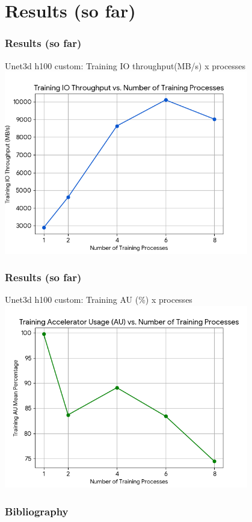 \documentclass[brazil, bsc, 10pt]{beamer}
\begin{document}
\section{Results (so far)}

\begin{frame}
	\frametitle{Results (so far)}
    \begin{block}{Unet3d h100 custom: Training IO throughput(MB/s) x processes}
		\includegraphics[width=0.8\textwidth]{./images/training_io.png}
	\end{block}
\end{frame}

\begin{frame}
	\frametitle{Results (so far)}
    \begin{block}{Unet3d h100 custom: Training AU (\%) x processes}
		\includegraphics[width=0.8\textwidth]{./images/training_au.png}
	\end{block}
\end{frame}


\begin{frame}[allowframebreaks]
	\frametitle{Bibliography}
	
\end{frame}
\end{document}
